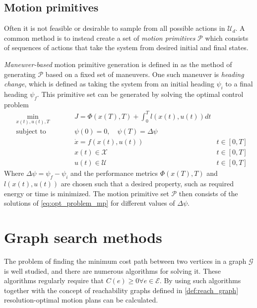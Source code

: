 \subsection{Motion primitives}\label{sec:motion_prim}
Often it is not feasible or desirable to sample from all possible actions in $\mathcal{U}_d$.
A common method is to instead create a set of \textit{motion primitives} $\mathcal{P}$ which consists of 
sequences of actions that take the system from desired initial and final states.

\textit{Maneuver-based} motion primitive generation is defined in \cite{Bergman_lic} as
the method of generating $\mathcal{P}$ based on a fixed set of maneuvers. One such 
maneuver is \textit{heading change}, which is defined as taking the system from an initial heading $\psi_i$ to a final heading $\psi_f$.
This primitive set can be generated by solving the optimal control problem
\begin{subequations}
    \label{eq:opt_problem_mp}
    \begin{alignat}{3}
    &\min_{x(t),u(t),T}        &\qquad& J=\Phi(x(T),T) + \int_{0}^{T} l(x(t),u(t))dt & \\
    &\text{subject to} & & \psi(0)=0,\quad \psi(T)=\Delta\psi &\\
    & & & \dot{x}=f(x(t), u(t)) &t\in[0,T]\\
    & & & x(t)\in\mathcal{X}& t\in[0,T]\\
    & & & u(t)\in\mathcal{U} & t\in[0,T]
    \end{alignat}
\end{subequations}
Where $\Delta\psi=\psi_f-\psi_i$ and the performance metrics $\Phi(x(T), T)$ and $l(x(t),u(t))$ are chosen such that a desired property, such as 
required energy or time is minimized. The motion primitive set $\mathcal{P}$ then consists of the 
solutions of \eqref{eq:opt_problem_mp} for different values of $\Delta\psi$.
\section{Graph search methods}
The problem of finding the minimum cost path between two vertices in a graph $\mathcal{G}$
is well studied, and there are numerous algorithms for solving it. These algorithms regularly require that 
$C(e)\geq0 \forall e\in\mathcal{E}$. By using such algorithms together with the concept of 
reachability graphs defined in \eqref{def:reach_graph} resolution-optimal motion plans can be calculated. 


